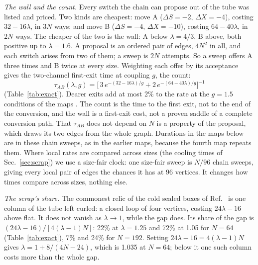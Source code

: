 \documentclass[aps,pre,10pt,twocolumn,superscriptaddress,nofootinbib]{revtex4-2}
\begin{document}
\emph{The wall and the count.} Every switch the chain can propose out of the tube was listed and priced. Two
kinds are cheapest: move A ($\Delta S=-2$, $\Delta X=-4$), costing $32-16\lambda$, in $3N$ ways; and move B
($\Delta S=-4$, $\Delta X=-10$), costing $64-40\lambda$, in $2N$ ways. The cheaper of the two is the wall: A below
$\lambda=4/3$, B above, both positive up to $\lambda=1.6$. A proposal is an ordered pair of edges, $4N^2$ in all,
and each switch arises from two of them; a sweep is $2N$ attempts. So a sweep offers A three times and B twice at
every size. Weighting each offer by its acceptance gives the two-channel first-exit time at coupling $g$, the
count:
\begin{equation}
  \tau_{AB}(\lambda,g) = \Big[\,3\,e^{-(32 - 16\lambda)/g} + 2\,e^{-(64 - 40\lambda)/g}\Big]^{-1}
  \label{eq:tau}
\end{equation}
(Table~\ref{tab:exact}). Dearer exits add at most 2\% to the rate at the $g=1.5$ conditions of the maps
\cite{paper1}. The count is the time to the first exit, not to the end of the conversion, and the wall is a
first-exit cost, not a proven saddle of a complete conversion path. That $\tau_{AB}$ does not depend on $N$ is a
property of the proposal, which draws its two edges from the whole graph. Durations in the maps below are in these
chain sweeps, as in the earlier maps, because the fourth map repeats them. Where local rates are compared across
sizes (the cooling times of Sec.~\ref{sec:scrap}) we use a size-fair clock: one size-fair sweep is $N/96$ chain
sweeps, giving every local pair of edges the chances it has at 96 vertices. It changes how times compare across
sizes, nothing else.

\emph{The scrap's share.} The commonest relic of the cold sealed boxes of Ref.~\cite{paper1} is one column of
the tube left curled: a closed loop of four vertices, costing $24\lambda-16$ above flat. It does not vanish as
$\lambda\to1$, while the gap does. Its share of the gap is $(24\lambda-16)/[4(\lambda-1)N]$: 22\% at
$\lambda=1.25$ and 72\% at 1.05 for $N=64$ (Table~\ref{tab:exact}), 7\% and 24\% for $N=192$. Setting
$24\lambda-16=4(\lambda-1)N$ gives $\lambda=1+8/(4N-24)$, which is 1.035 at $N=64$; below it one such column
costs more than the whole gap.
\end{document}
